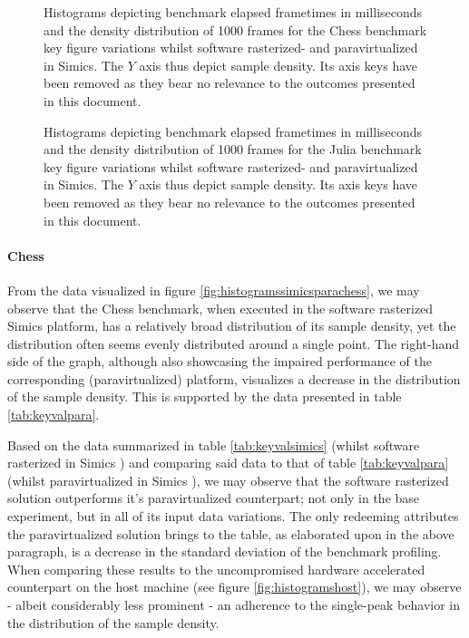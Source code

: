 \begin{figure}
  \centering
  
  \caption[Benchmark results - paravirtualized in Simics, Chess]{Histograms depicting benchmark elapsed frametimes in milliseconds and the density distribution of 1000 frames for the Chess benchmark key figure variations whilst software rasterized- and paravirtualized in Simics. The $Y$ axis thus depict sample density. Its axis keys have been removed as they bear no relevance to the outcomes presented in this document.}
  \label{fig:histogramssimicsparachess}

  
  \caption[Benchmark results - paravirtualized in Simics, Julia]{Histograms depicting benchmark elapsed frametimes in milliseconds and the density distribution of 1000 frames for the Julia benchmark key figure variations whilst software rasterized- and paravirtualized in Simics. The $Y$ axis thus depict sample density. Its axis keys have been removed as they bear no relevance to the outcomes presented in this document.}
  \label{fig:histogramssimicsparajulia}
\end{figure}

\paragraph{Chess}
\label{par:results_chess}
From the data visualized in figure \ref{fig:histogramssimicsparachess}, we may observe that the Chess benchmark, when executed in the software rasterized Simics platform, has a relatively broad distribution of its sample density, yet the distribution often seems evenly distributed around a single point.
The right-hand side of the graph, although also showcasing the impaired performance of the corresponding (paravirtualized) platform, visualizes a decrease in the distribution of the sample density.
This is supported by the data presented in table \ref{tab:keyvalpara}.

Based on the data summarized in table \ref{tab:keyvalsimics} (whilst software rasterized in Simics ) and comparing said data to that of table \ref{tab:keyvalpara} (whilst paravirtualized in Simics ), we may observe that the software rasterized solution outperforms it's paravirtualized counterpart; not only in the base experiment, but in all of its input data variations.
The only redeeming attributes the paravirtualized solution brings to the table, as elaborated upon in the above paragraph, is a decrease in the standard deviation of the benchmark profiling.
When comparing these results to the uncompromised hardware accelerated counterpart on the host machine (see figure \ref{fig:histogramshost}), we may observe - albeit considerably less prominent - an adherence to the single-peak behavior in the distribution of the sample density.

